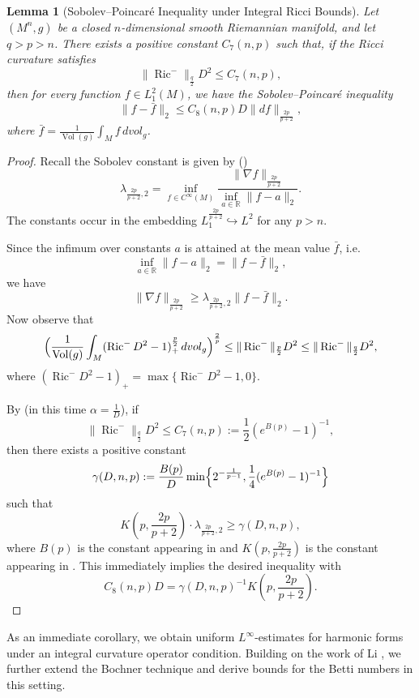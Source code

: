 \documentclass[12pt, twoside]{article}
\newtheorem{lemma}[theorem]{Lemma}
\theoremstyle{definition}
\numberwithin{equation}{section}
\def \a {\alpha }
\def \la {\lambda}
\def\na {\nabla}
\begin{document}
	\begin{lemma}[Sobolev--Poincar\'e Inequality under Integral Ricci Bounds]\label{lem:sobolev-poincare-ricci}
		Let \((M^{n},g)\) be a closed \(n\)-dimensional smooth Riemannian manifold, and let $q>p>n$.  There exists a positive constant \(C_7(n,p)\) such that, if the Ricci curvature satisfies
		\[
		\|\operatorname{Ric}^{-}\|_\frac{q}{2} D^2 \le C_7(n,p),
		\]
		then for every function \(f \in L^2_1(M)\), we have the Sobolev--Poincar\'e inequality
		\[
		\|f - \bar{f}\|_2 \le C_8(n,p)D\|df\|_{\frac{2p}{p+2}},
		\]
		where \(\bar{f} = \frac{1}{\operatorname{Vol}(g)} \int_M f\, dvol_g\).
	\end{lemma}
	\begin{proof}
        Recall the Sobolev constant is given by (\cite[Page 201]{Gallot1988}) 
		\[
		\lambda_{\frac{2p}{p+2},2} 
		= \inf_{f \in C^\infty(M)} 
		\frac{\|\nabla f\|_{\frac{2p}{p+2}}}{\inf_{a \in \mathbb{R}} \|f - a\|_2 }.
		\]
		The constants occur in the embedding $L^{\frac{2p}{p+2}}_{1}\hookrightarrow L^{2}$ for any $p>n$.
		
		Since the infimum over constants \(a\) is attained at the mean value \(\bar{f}\), i.e.
		$$\inf_{a\in\mathbb{R}} \|f-a\|_{2}=\|f-\bar{f}\|_{2},$$ we have
		\[
			\|\na f\|_{\frac{2p}{p+2}}\geq \la_{\frac{2p}{p+2},2}  \|f-\bar{f}\|_{2}.\]
		Now observe that
		\[
		\Bigl(\frac{1}{\operatorname{Vol}(g)} \int_M (\operatorname{Ric}^{-} D^2 - 1)_+^\frac{p}{2} \, dvol_g\Bigr)^{\frac{2}{p}}
		\le \|\operatorname{Ric}^{-}\|_\frac{p}{2} D^2\leq \|\operatorname{Ric}^{-}\|_\frac{q}{2} D^2,
		\]
		where \((\operatorname{Ric}^{-} D^2 - 1)_+ = \max\{\operatorname{Ric}^{-} D^2 - 1, 0\}\).
		
	By \cite[Theorem 6]{Gallot1988} (in this time $\a=\frac{1}{D}$),  if \[\|\operatorname{Ric}^{-}\|_\frac{q}{2} D^2 \le C_{7}(n,p):=\frac{1}{2}(e^{B(p)}-1)^{-1},\]
		then there exists a positive constant
		\[
		\gamma(D,n,p) := \frac{B(p)}{D} 
		\min\Bigl\{2^{-\frac{1}{p-1}}, \frac{1}{4}(e^{B(p)} - 1)^{-1}\Bigr\}
		\]
		such that
		\[
	K(p,\frac{2p}{p+2})\cdot	\lambda_{\frac{2p}{p+2},2} \ge \gamma(D,n,p),
		\]
		where \(B(p)\) is the constant appearing in \cite[Theorem 2]{Gallot1988} and $K(p,\frac{2p}{p+2})$ is the constant appearing in \cite[Theorem 6]{Gallot1988}. This immediately implies the desired inequality with 
		\[C_8(n,p)D = \gamma(D,n,p)^{-1}K(p,\frac{2p}{p+2}).\]
		\end{proof}
As an immediate corollary, we obtain uniform $L^\infty$-estimates for harmonic forms under an integral curvature operator condition. Building on the work of Li \cite{Li1980}, we further extend the Bochner technique and derive bounds for the Betti numbers in this setting.	
\end{document}
